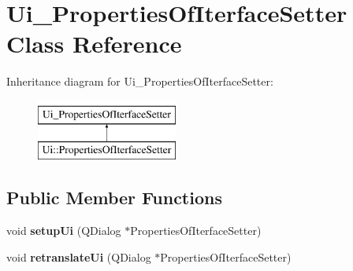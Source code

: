 \hypertarget{class_ui___properties_of_iterface_setter}{\section{Ui\-\_\-\-Properties\-Of\-Iterface\-Setter Class Reference}
\label{class_ui___properties_of_iterface_setter}
}
Inheritance diagram for Ui\-\_\-\-Properties\-Of\-Iterface\-Setter\-:\begin{figure}[H]
\begin{center}
\leavevmode
\includegraphics[height=2.000000cm]{class_ui___properties_of_iterface_setter}
\end{center}
\end{figure}
\subsection*{Public Member Functions}
\begin{DoxyCompactItemize}
\item 
\hypertarget{class_ui___properties_of_iterface_setter_aa9a32ece385e11a20a6dbc132556c240}{void {\bfseries setup\-Ui} (Q\-Dialog $\ast$Properties\-Of\-Iterface\-Setter)}\label{class_ui___properties_of_iterface_setter_aa9a32ece385e11a20a6dbc132556c240}

\item 
\hypertarget{class_ui___properties_of_iterface_setter_a4a47e942bda4038e1c44b14aaacf0b61}{void {\bfseries retranslate\-Ui} (Q\-Dialog $\ast$Properties\-Of\-Iterface\-Setter)}\label{class_ui___properties_of_iterface_setter_a4a47e942bda4038e1c44b14aaacf0b61}

\end{DoxyCompactItemize}
